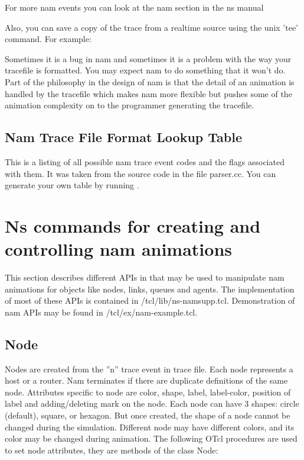 For more nam events you can look at the nam section in the ns manual

Also, you can save a copy of the trace from a realtime
source using the unix 'tee' command. For example:

\begin{program}
\end{program}

Sometimes it is a bug in nam and sometimes it is a problem with the way
your tracefile is formatted.  You may expect nam to do something that it
won't do.  Part of the philosophy in the design of nam is that the detail of
an animation is handled by the tracefile which makes nam more flexible
but pushes some of the animation complexity on to the programmer
generating the tracefile. 

\subsection{Nam Trace File Format Lookup Table}
This is a listing of all possible nam trace event codes and the flags associated with them.  It was taken from the source code in the file parser.cc.  You can generate your own table by running .




\section{Ns commands for creating and controlling nam animations}
\label{sec:namcommands}

This section describes different APIs in \ns that may be used to
manipulate nam animations for objects like nodes, links, queues and
agents. 
The implementation of most of these APIs is contained in
\ns/tcl/lib/ns-namsupp.tcl.
Demonstration of nam APIs may be found in \ns/tcl/ex/nam-example.tcl.

\subsection{Node}

Nodes are created from the ''n'' trace event in trace file. 
Each node represents a host or a router. 
Nam terminates if there are duplicate definitions of the same node.
Attributes specific to node are color, shape, label, label-color,
position of label and adding/deleting mark on the node.
Each node can have 3 shapes: circle (default), square, or hexagon.
But once created, the shape of a node cannot be changed during the
simulation.
Different node may have different colors, and its color may be changed
during animation. 
The following OTcl procedures are used to set node attributes, they
are methods of the class Node:

